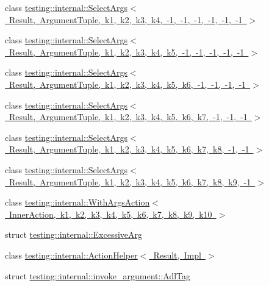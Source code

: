 \begin{DoxyCompactItemize}
\item 
class \mbox{\hyperlink{classtesting_1_1internal_1_1SelectArgs_3_01Result_00_01ArgumentTuple_00_01k1_00_01k2_00_01k3_00_030eb2335b9fd029fe61511c21b4d364}{testing\+::internal\+::\+Select\+Args$<$ Result, Argument\+Tuple, k1, k2, k3, k4, -\/1, -\/1, -\/1, -\/1, -\/1, -\/1 $>$}}
\item 
class \mbox{\hyperlink{classtesting_1_1internal_1_1SelectArgs_3_01Result_00_01ArgumentTuple_00_01k1_00_01k2_00_01k3_00_dabb861d0dfd59e876e4adc8d7e61c25}{testing\+::internal\+::\+Select\+Args$<$ Result, Argument\+Tuple, k1, k2, k3, k4, k5, -\/1, -\/1, -\/1, -\/1, -\/1 $>$}}
\item 
class \mbox{\hyperlink{classtesting_1_1internal_1_1SelectArgs_3_01Result_00_01ArgumentTuple_00_01k1_00_01k2_00_01k3_00_bb7097ad0bebc299c171ea7e2f7fc9a0}{testing\+::internal\+::\+Select\+Args$<$ Result, Argument\+Tuple, k1, k2, k3, k4, k5, k6, -\/1, -\/1, -\/1, -\/1 $>$}}
\item 
class \mbox{\hyperlink{classtesting_1_1internal_1_1SelectArgs_3_01Result_00_01ArgumentTuple_00_01k1_00_01k2_00_01k3_00_39929402cb68b57f60e280a41eb60fed}{testing\+::internal\+::\+Select\+Args$<$ Result, Argument\+Tuple, k1, k2, k3, k4, k5, k6, k7, -\/1, -\/1, -\/1 $>$}}
\item 
class \mbox{\hyperlink{classtesting_1_1internal_1_1SelectArgs_3_01Result_00_01ArgumentTuple_00_01k1_00_01k2_00_01k3_00_5bf9522b4f7bab9048d7587f1d9fbf27}{testing\+::internal\+::\+Select\+Args$<$ Result, Argument\+Tuple, k1, k2, k3, k4, k5, k6, k7, k8, -\/1, -\/1 $>$}}
\item 
class \mbox{\hyperlink{classtesting_1_1internal_1_1SelectArgs_3_01Result_00_01ArgumentTuple_00_01k1_00_01k2_00_01k3_00_a44b2a3fb6bab261818c61ba2b7f389a}{testing\+::internal\+::\+Select\+Args$<$ Result, Argument\+Tuple, k1, k2, k3, k4, k5, k6, k7, k8, k9, -\/1 $>$}}
\item 
class \mbox{\hyperlink{classtesting_1_1internal_1_1WithArgsAction}{testing\+::internal\+::\+With\+Args\+Action$<$ Inner\+Action, k1, k2, k3, k4, k5, k6, k7, k8, k9, k10 $>$}}
\item 
struct \mbox{\hyperlink{structtesting_1_1internal_1_1ExcessiveArg}{testing\+::internal\+::\+Excessive\+Arg}}
\item 
class \mbox{\hyperlink{classtesting_1_1internal_1_1ActionHelper}{testing\+::internal\+::\+Action\+Helper$<$ Result, Impl $>$}}
\item 
struct \mbox{\hyperlink{structtesting_1_1internal_1_1invoke__argument_1_1AdlTag}{testing\+::internal\+::invoke\+\_\+argument\+::\+Adl\+Tag}}
\end{DoxyCompactItemize}
